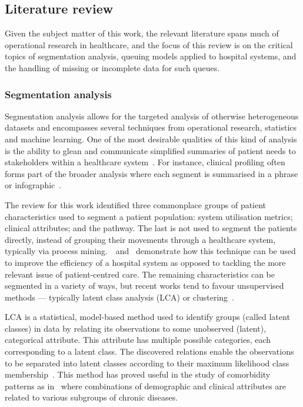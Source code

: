 \documentclass[11pt]{article}
\begin{document}
\subsection{Literature review}\label{subsec:review}

Given the subject matter of this work, the relevant literature spans much of
operational research in healthcare, and the focus of this review is on the
critical topics of segmentation analysis, queuing models applied to hospital
systems, and the handling of missing or incomplete data for such queues.

\subsubsection{Segmentation analysis}

Segmentation analysis allows for the targeted analysis of otherwise
heterogeneous datasets and encompasses several techniques from operational
research, statistics and machine learning. One of the most desirable qualities
of this kind of analysis is the ability to glean and communicate simplified
summaries of patient needs to stakeholders within a healthcare
system~\cite{Vuik2016b, Yoon2020}. For instance, clinical profiling often forms
part of the broader analysis where each segment is summarised in a phrase or
infographic~\cite{Vuik2016a, Yan2019}.

The review for this work identified three commonplace groups of patient
characteristics used to segment a patient population: system utilisation
metrics; clinical attributes; and the pathway. The last is not used to segment
the patients directly, instead of grouping their movements through a healthcare
system, typically via process mining.~\cite{Arnolds2018}~and~\cite{Delias2015}
demonstrate how this technique can be used to improve the efficiency of a
hospital system as opposed to tackling the more relevant issue of
patient-centred care. The remaining characteristics can be segmented in a
variety of ways, but recent works tend to favour unsupervised methods —
typically latent class analysis (LCA) or clustering~\cite{Yan2018}.

LCA is a statistical, model-based method used to identify groups (called latent
classes) in data by relating its observations to some unobserved (latent),
categorical attribute. This attribute has multiple possible categories, each
corresponding to a latent class. The discovered relations enable the
observations to be separated into latent classes according to their maximum
likelihood class membership~\cite{Hagenaars2002,Lazarsfeld1968}. This method has
proved useful in the study of comorbidity patterns as
in~\cite{Kuwornu2014,Larsen2017} where combinations of demographic and clinical
attributes are related to various subgroups of chronic diseases.
\end{document}
